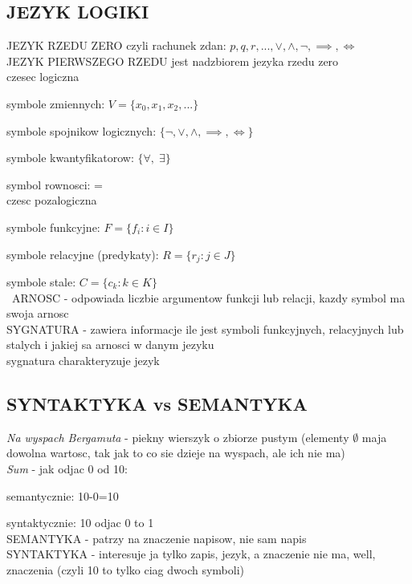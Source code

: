 \documentclass{article}
\begin{document}
\subsection*{\color{tit}JEZYK LOGIKI}
  \color{emp}JEZYK RZEDU ZERO \color{txt}czyli rachunek zdan: $p, q, r, ..., \lor, \land, \neg, \implies, \iff$\bigskip\\
  \color{emp}JEZYK PIERWSZEGO RZEDU \color{txt}jest nadzbiorem jezyka rzedu zero\smallskip\\
  \color{acc}czesec logiczna\color{txt}\smallskip\par
    symbole zmiennych: $V =\{x_0, x_1, x_2,...\}$\smallskip\par
    symbole spojnikow logicznych: $\{\neg, \lor, \land, \implies, \iff\}$\smallskip\par
    symbole kwantyfikatorow: $\{\forall, \;\exists\}$\smallskip\par
    symbol rownosci: =\smallskip\\
  \color{acc}czesc pozalogiczna\color{txt}\smallskip\par
    symbole funkcyjne: $F = \{f_i : i\in I\}$\smallskip\par
    symbole relacyjne (predykaty): $R = \{r_j : j\in J\}$\smallskip\par
    symbole stale: $C = \{c_k : k\in K\}$\medskip\\\
  \color{def}ARNOSC \color{txt}- odpowiada liczbie argumentow funkcji lub relacji, kazdy symbol ma swoja arnosc\smallskip\\
  \color{def}SYGNATURA \color{txt}- zawiera informacje ile jest symboli funkcyjnych, relacyjnych lub stalych i jakiej sa arnosci w danym jezyku\\sygnatura charakteryzuje jezyk
\subsection*{\color{tit}SYNTAKTYKA vs SEMANTYKA}
  \emph{Na wyspach Bergamuta }- piekny wierszyk o zbiorze pustym (elementy $\emptyset$ maja dowolna wartosc, tak jak to co sie dzieje na wyspach, ale ich nie ma)\medskip\\
  \emph{Sum} - jak odjac 0 od 10:\smallskip\par
    \color{acc}semantycznie: \color{txt}10-0=10\smallskip\par
    \color{acc}syntaktycznie: \color{txt}10 odjac 0 to 1\bigskip\\
  \color{def}SEMANTYKA \color{txt}- patrzy na znaczenie napisow, nie sam napis\smallskip\\
  \color{def}SYNTAKTYKA \color{txt}- interesuje ja tylko zapis, jezyk, a znaczenie nie ma, well, znaczenia (czyli 10 to tylko ciag dwoch symboli)
\end{document}
